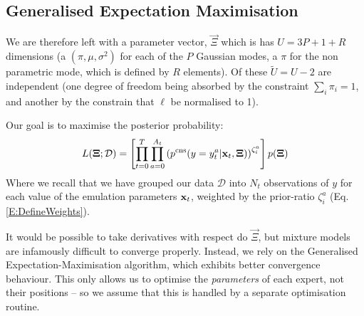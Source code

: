 \subsection{Generalised Expectation Maximisation}

	We are therefore left with a parameter vector, $\vec{\Xi}$ which is has $U = 3P + 1 + R$ dimensions (a $(\pi,\mu,\sigma^2)$ for each of the $P$ Gaussian modes, a $\pi$ for the non parametric mode, which is defined by $R$ elements). Of these $\tilde{U} = U - 2$ are independent (one degree of freedom being absorbed by the constraint $\sum_i \pi_i = 1$, and another by the constrain that $\ell$ be normalised to 1).

	Our goal is to maximise the posterior probability:
	\begin{equation}
		L(\mathbf{\boldsymbol{\mathrm{\Xi}}}; \mathcal{D}) =\left[ \prod_{t=0}^{T} \prod_{a = 0}^{A_t} \left(p^\text{cns}(y = y_t^a | \mathbf{\boldsymbol{\mathrm{x}}}_t, \mathbf{\boldsymbol{\mathrm{\Xi}}})\right)^{\zeta_i^a} \right]p(\mathbf{\boldsymbol{\mathrm{\Xi}}})
	\end{equation}
	Where we recall that we have grouped our data $\mathcal{D}$ into $N_t$ observations of $y$ for each value of the emulation parameters $\mathbf{\boldsymbol{\mathrm{x}}}_t$, weighted by the prior-ratio $\zeta_i^a$ (Eq. \ref{E:DefineWeights}).

	It would be possible to take derivatives with respect do $\vec{\Xi}$, but mixture models are infamously difficult to converge properly. Instead, we rely on the Generalised Expectation-Maximisation algorithm, which exhibits better convergence behaviour. This only allows us to optimise the \textit{parameters} of each expert, not their positions -- so we assume that this is handled by a separate optimisation routine.

